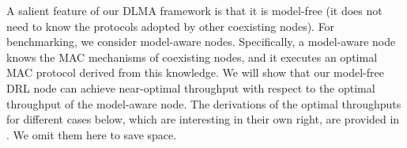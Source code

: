 \documentclass[journal,comsoc]{IEEEtran}
\begin{document}
A salient feature of our DLMA framework is that it is model-free (it does not need to know the protocols adopted by other coexisting nodes). For benchmarking, we consider model-aware nodes. Specifically, a model-aware node knows the MAC mechanisms of coexisting nodes, and it executes an optimal MAC protocol derived from this knowledge. We will show that our model-free DRL node can achieve near-optimal throughput with respect to the optimal throughput of the model-aware node. The derivations of the optimal throughputs for different cases below, which are interesting in their own right, are provided in \cite{benchmark}. We omit them here to save space. 
\end{document}
